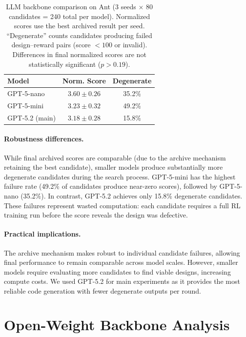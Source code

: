 \begin{table}[htbp]
\centering
\caption{LLM backbone comparison on Ant (3 seeds $\times$ 80 candidates = 240 total per model). Normalized scores use the best archived result per seed. ``Degenerate'' counts candidates producing failed design--reward pairs (score $<100$ or invalid). Differences in final normalized scores are not statistically significant ($p > 0.19$).}
\label{tab:llm_sensitivity}
\small
\begin{tabular}{lcc}
\toprule
\textbf{Model} & \textbf{Norm. Score} & \textbf{Degenerate} \\
\midrule
GPT-5-nano & $3.60 \pm 0.26$ & 35.2\% \\
GPT-5-mini & $3.23 \pm 0.32$ & 49.2\% \\
\rowcolor{gray!15}
GPT-5.2 (main) & $3.18 \pm 0.28$ & 15.8\% \\
\bottomrule
\end{tabular}
\end{table}

\paragraph{Robustness differences.}
While final archived scores are comparable (due to the archive mechanism retaining the best candidate), smaller models produce substantially more degenerate candidates during the search process. GPT-5-mini has the highest failure rate (49.2\% of candidates produce near-zero scores), followed by GPT-5-nano (35.2\%). In contrast, GPT-5.2 achieves only 15.8\% degenerate candidates. These failures represent wasted computation: each candidate requires a full RL training run before the score reveals the design was defective.

\paragraph{Practical implications.}
The archive mechanism makes \abbrev{} robust to individual candidate failures, allowing final performance to remain comparable across model scales. However, smaller models require evaluating more candidates to find viable designs, increasing compute costs. We used GPT-5.2 for main experiments as it provides the most reliable code generation with fewer degenerate outputs per round.

\section{Open-Weight Backbone Analysis}
\label{app:open_weight_backbones}

